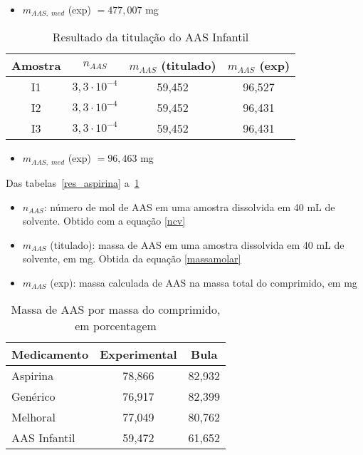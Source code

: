 \begin{itemize}
    \item $m_{AAS,\; med}$ (exp) $= 477,007$ mg
\end{itemize}

\begin{table}[H]
    \centering
    \begin{tabular}{c c c c}
        \toprule
        Amostra & $n_{AAS}$ & $m_{AAS}$ (titulado) & $m_{AAS}$ (exp) \\
        \midrule
        I1 & $3,3\cdot 10^{-4}$ & 59,452 & 96,527 \\
        I2 & $3,3\cdot 10^{-4}$ & 59,452 & 96,431 \\
        I3 & $3,3\cdot 10^{-4}$ & 59,452 & 96,431 \\
        \bottomrule
    \end{tabular}
    \caption{Resultado da titulação do AAS Infantil}
    \label{res_infantil}
\end{table}

\begin{itemize}
    \item $m_{AAS,\; med}$ (exp) $= 96,463$ mg
\end{itemize}

Das tabelas~\ref{res_aspirina} a~\ref{res_infantil}

\begin{itemize}
    \item[] $n_{AAS}$: número de mol de AAS em uma amostra dissolvida em 40 mL de solvente. Obtido
        com a equação \eqref{ncv}
    \item[] $m_{AAS}$ (titulado): massa de AAS em uma amostra dissolvida 
        em 40 mL de solvente, em mg. Obtida da equação \eqref{massamolar}
    \item[]$m_{AAS}$ (exp): massa calculada de AAS na massa total do comprimido, em mg
\end{itemize}

\begin{table}[H]\label{porcentagem2}
    \centering
    \begin{tabular}{l c c}
        \toprule
        Medicamento & Experimental & Bula \\
        \midrule
        Aspirina\R   & 78,866 & 82,932 \\
        Genérico     & 76,917  & 82,399 \\
        Melhoral\R     & 77,049  & 80,762 \\
        AAS Infantil & 59,472  & 61,652 \\
        \bottomrule
    \end{tabular}
    \caption{Massa de AAS por massa do comprimido, em porcentagem}
\end{table}
